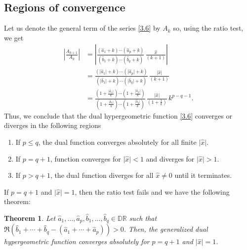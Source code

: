 \documentclass[11pt,a4paper,fleqn]{article}
\newtheorem{theorem}{Theorem}
\numberwithin{equation}{section}
\numberwithin{lemma}{section}
\numberwithin{theorem}{section}
\numberwithin{corollary}{section}
\begin{document}
\subsection{Regions of convergence}
Let us denote the general term of the series \eqref{3.6} by $A_k$ so, using the ratio test, we get
\begin{align*}
	\left\vert \frac{A_{k + 1}}{A_k}\right \vert & = \left \vert \frac{(\widehat{a}_1 + k) \cdots (\widehat{a}_p + k)}{(\widehat{b}_1 + k) \cdots (\widehat{b}_q + k)}  \, \frac{\widehat{x}}{(k + 1)}\right \vert\nonumber\\
	& =   \frac{( \vert\widehat{a}_1\vert + k) \cdots (\vert\widehat{a}_p\vert + k)}{(\vert\widehat{b}_1\vert + k) \cdots (\vert\widehat{b}_q\vert + k)}  \, \frac{\vert\widehat{x}\vert}{(k + 1)}\\
	& = \frac{\left(1 +  \frac{\vert\widehat{a}_1\vert}{k}\right) \cdots \left(1 +  \frac{\vert\widehat{a}_p\vert}{k}\right)}{\left(1 +  \frac{\vert\widehat{b}_1\vert}{k}\right) \cdots \left(1 +  \frac{\vert\widehat{b}_q\vert}{k}\right)}  \, \frac{\vert\widehat{x}\vert}{\left(1 +  \frac{1}{k}\right)} \, k^{p - q - 1}.
\end{align*}
Thus, we conclude that the dual hypergeometric function \eqref{3.6} converges or diverges in the following regions
	\begin{enumerate}
	\item If $p \le q$, the dual function converges absolutely for all finite $\vert\widehat{x} \vert$.
	\item If $p = q + 1$, function converges for $\vert \widehat{x} \vert < 1$ and diverges for $\vert \widehat{x} \vert > 1$.
	\item If $p > q + 1$, the dual function diverges for all $\widehat{x} \ne 0$ until it terminates.
\end{enumerate}
If $p = q + 1$ and $\vert \widehat{x} \vert = 1$, then the ratio test fails and we have the following theorem:
\begin{theorem}
	Let $\widehat{a}_1, \dots, \widehat{a}_p, \widehat{b}_1, \dots, \widehat{b}_q \in \mathbb{D} \mathbb{R}$  such that $\Re {(\widehat{b}_1 + \cdots + \widehat{b}_q - (\widehat{a}_1 +  \cdots + \widehat{a}_p))} > 0$. Then, the generalized dual hypergeometric function converges absolutely for $p = q + 1$ and $\vert \widehat{x} \vert = 1$. 
\end{theorem}
\end{document}
